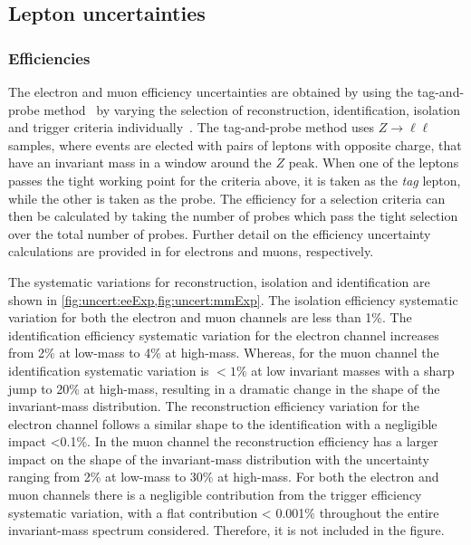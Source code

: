 \subsection{Lepton uncertainties}

\subsubsection{Efficiencies}
The electron and muon efficiency uncertainties are obtained by using the tag-and-probe method~\cite{Aaboud:2016vfy,Aad:2016jkr} by varying the selection of reconstruction, identification, isolation and trigger criteria individually~\cite{Aad:2019tso,Aad:2016jkr}. The tag-and-probe method uses $Z\rightarrow \ell\ell$ samples, where events are elected with pairs of leptons with opposite charge, that have an invariant mass in a window around the $Z$ peak. When one of the leptons passes the tight working point for the criteria above, it is taken as the \emph{tag} lepton, while the other is taken as the probe. The efficiency for a selection criteria can then be calculated by taking the number of probes which pass the tight selection over the total number of probes. Further detail on the efficiency uncertainty calculations are provided in \cite{Aad:2019tso,Aad:2016jkr} for electrons and muons, respectively. 

The systematic variations for reconstruction, isolation and identification are shown in \cref{fig:uncert:eeExp,fig:uncert:mmExp}. The isolation efficiency systematic variation for both the electron and muon channels are less than 1\%. The identification efficiency systematic variation for the electron channel increases from 2\% at low-mass to 4\% at high-mass. Whereas, for the muon channel the identification systematic variation is $< 1\%$ at low invariant masses with a sharp jump to 20\% at high-mass, resulting in a dramatic change in the shape of the invariant-mass distribution. The reconstruction efficiency variation for the electron channel follows a similar shape to the identification with a negligible impact <0.1\%. In the muon channel the reconstruction efficiency has a larger impact on the shape of the invariant-mass distribution with the uncertainty ranging from 2\% at low-mass to 30\% at high-mass. For both the electron and muon channels there is a negligible contribution from the trigger efficiency systematic variation, with a flat contribution < 0.001\% throughout the entire invariant-mass spectrum considered. Therefore, it is not included in the figure. 

